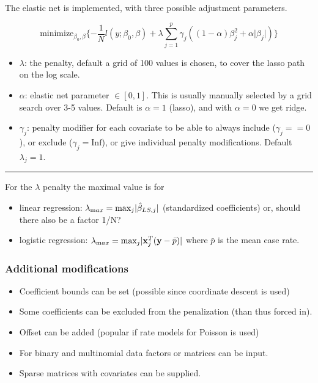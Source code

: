 \documentclass[
]{article}
\providecommand{\tightlist}{%
  \setlength{\itemsep}{0pt}\setlength{\parskip}{0pt}}
\begin{document}
The elastic net is implemented, with three possible adjustment
parameters.

\[ \text{minimize}_{\beta_0,\beta} \{ -\frac{1}{N} l(y;\beta_0,\beta)+\lambda \sum_{j=1}^p
\gamma_j ((1-\alpha)\beta_j^2+\alpha \lvert \beta_j \rvert)\}\]

\begin{itemize}
\tightlist
\item
  \(\lambda\): the penalty, default a grid of 100 values is chosen, to
  cover the lasso path on the log scale.
\item
  \(\alpha\): elastic net parameter \(\in [0,1]\). This is usually
  manually selected by a grid search over 3-5 values. Default is
  \(\alpha=1\) (lasso), and with \(\alpha=0\) we get ridge.
\item
  \(\gamma_j\): penalty modifier for each covariate to be able to always
  include (\(\gamma_j==0\)), or exclude (\(\gamma_j=\text{Inf}\)), or
  give individual penalty modifications. Default \(\lambda_j=1\).
\end{itemize}

\begin{center}\rule{0.5\linewidth}{0.5pt}\end{center}

For the \(\lambda\) penalty the maximal value is for

\begin{itemize}
\tightlist
\item
  linear regression:
  \(\lambda_{\text max}=\text{max}_j \lvert \hat{\beta}_{LS,j} \rvert\)
  (standardized coefficients) or, should there also be a factor 1/N?
\item
  logistic regression:
  \(\lambda_{\text max}=\text{max}_{j}\lvert {\bf x}_j ^T ({\bf y}-\bar{p}) \rvert\)
  where \(\bar p\) is the mean case rate.
\end{itemize}

\hypertarget{additional-modifications}{%
\subsubsection{Additional
modifications}\label{additional-modifications}}

\begin{itemize}
\tightlist
\item
  Coefficient bounds can be set (possible since coordinate descent is
  used)
\item
  Some coefficients can be excluded from the penalization (than thus
  forced in).
\item
  Offset can be added (popular if rate models for Poisson is used)
\item
  For binary and multinomial data factors or matrices can be input.
\item
  Sparse matrices with covariates can be supplied.
\end{itemize}
\end{document}
